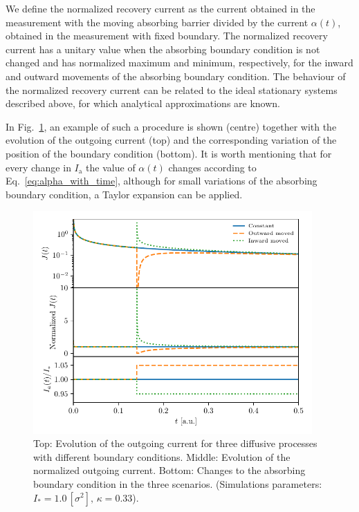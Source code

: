We define the normalized recovery current as the current obtained in the measurement with the moving absorbing barrier divided by the current $\alpha(t)$, obtained in the measurement with fixed boundary. The normalized recovery current has a unitary value when the absorbing boundary condition is not changed and has normalized maximum and minimum, respectively, for the inward and outward movements of the absorbing boundary condition. The behaviour of the normalized recovery current can be related to the ideal stationary systems described above, for which analytical approximations are known.

In Fig.~\ref{fig:fixed-vs-moved-boundary}, an example of such a procedure is shown (centre) together with the evolution of the outgoing current (top) and the corresponding variation of the position of the boundary condition (bottom). It is worth mentioning that for every change in $I_\mathrm{a}$ the value of $\alpha(t)$ changes according to Eq.~\eqref{eq:alpha_with_time}, although for small variations of the absorbing boundary condition, a Taylor expansion can be applied.

\begin{figure}[t]
    \centering
    \includegraphics[width=0.95\textwidth]{4_probing_the_diffusive_behavior/figs/final/global_vs_moving_current.pdf}
    \caption{Top: Evolution of the outgoing current for three diffusive processes with different boundary conditions. Middle: Evolution of the normalized outgoing current. Bottom: Changes to the absorbing boundary condition in the three scenarios. (Simulations parameters: $I_\ast = 1.0\,[\sigma^2], \, \kappa = 0.33$).}
    \label{fig:fixed-vs-moved-boundary}
\end{figure}

